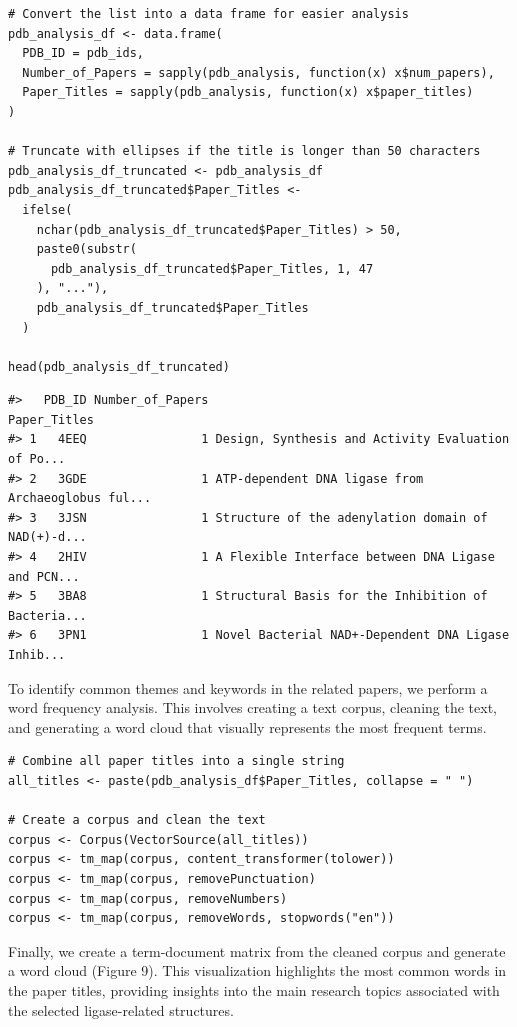 \begin{verbatim}
# Convert the list into a data frame for easier analysis
pdb_analysis_df <- data.frame(
  PDB_ID = pdb_ids,
  Number_of_Papers = sapply(pdb_analysis, function(x) x$num_papers),
  Paper_Titles = sapply(pdb_analysis, function(x) x$paper_titles)
)

# Truncate with ellipses if the title is longer than 50 characters
pdb_analysis_df_truncated <- pdb_analysis_df
pdb_analysis_df_truncated$Paper_Titles <-
  ifelse(
    nchar(pdb_analysis_df_truncated$Paper_Titles) > 50,
    paste0(substr(
      pdb_analysis_df_truncated$Paper_Titles, 1, 47
    ), "..."),
    pdb_analysis_df_truncated$Paper_Titles
  )

head(pdb_analysis_df_truncated)  
\end{verbatim}

\begin{verbatim}
#>   PDB_ID Number_of_Papers                                       Paper_Titles
#> 1   4EEQ                1 Design, Synthesis and Activity Evaluation of Po...
#> 2   3GDE                1 ATP-dependent DNA ligase from Archaeoglobus ful...
#> 3   3JSN                1 Structure of the adenylation domain of NAD(+)-d...
#> 4   2HIV                1 A Flexible Interface between DNA Ligase and PCN...
#> 5   3BA8                1 Structural Basis for the Inhibition of Bacteria...
#> 6   3PN1                1 Novel Bacterial NAD+-Dependent DNA Ligase Inhib...
\end{verbatim}

To identify common themes and keywords in the related papers, we perform a word frequency analysis. This involves creating a text corpus, cleaning the text, and generating a word cloud that visually represents the most frequent terms.

\begin{verbatim}
# Combine all paper titles into a single string
all_titles <- paste(pdb_analysis_df$Paper_Titles, collapse = " ")

# Create a corpus and clean the text
corpus <- Corpus(VectorSource(all_titles))
corpus <- tm_map(corpus, content_transformer(tolower))
corpus <- tm_map(corpus, removePunctuation)
corpus <- tm_map(corpus, removeNumbers)
corpus <- tm_map(corpus, removeWords, stopwords("en"))
\end{verbatim}

Finally, we create a term-document matrix from the cleaned corpus and generate a word cloud (Figure 9). This visualization highlights the most common words in the paper titles, providing insights into the main research topics associated with the selected ligase-related structures.

